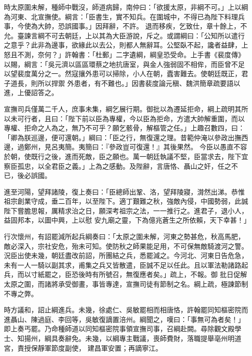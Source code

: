 \begin{pinyinscope}
 時太原圍未解，種師中戰沒，師道病歸，南仲曰：「欲援太原，非綱不可。」上以綱為河東、北宣撫使。綱言：「臣書生，實不知兵。在圍城中，不得已為陛下料理兵事，今使為大帥，恐誤國事。」因拜辭，不許。
 退而移疾，乞致仕，章十餘上，不允。臺諫言綱不可去朝廷，上以其為大臣游說，斥之。或謂綱曰：「公知所以遣行之意乎？此非為邊事，欲緣此以去公，則都人無辭耳。公堅臥不起，讒者益肆，上怒且不測，奈何？」許翰書：「杜郵」二字遺綱，綱皇恐受命。上手書《裴度傳》以賜，綱言：「吳元濟以區區環蔡之地抗唐室，與金人強弱固不相侔，而臣曾不足以望裴度萬分之一。然寇攘外患可以掃除，小人在朝，蠹害難去。使朝廷既正，君子道長，則所以捍禦
 外患者，有不難也。」因書裴度論元稹、魏洪簡章疏要語以進，上優詔答之。



 宣撫司兵僅萬二千人，庶事未集，綱乞展行期。御批以為遷延拒命，綱上疏明其所以未可行者，且曰：「陛下前以臣為專權，今以臣為拒命，方遣大帥解重圍，而以專權、拒命之人為之，無乃不可乎？願乞骸骨，解樞管之任。」上趣召數四，曰：「卿為朕巡邊，便可還朝。」綱曰：「臣之行，無復還之理。昔範仲淹以參政出撫西邊，過鄭州，見呂夷簡。夷簡曰：『參政豈可復還！』其後果然。
 今臣以愚直不容於朝，使既行之後，進而死敵，臣之願也。萬一朝廷執議不堅，臣當求去，陛下宜察臣孤忠，以全君臣之義。」上為之感動。及陛辭，言唐恪、聶山之奸，任之不已，後必誤國。



 進至河陽，望拜諸陵，復上奏曰：「臣總師出鞏、洛，望拜陵寢，潸然出涕。恭惟祖宗創業守成，垂二百年，以至陛下。適丁艱難之秋，強敵內侵，中國勢弱，此誠陛下嘗膽思報，厲精求治之日，願深考祖宗之法，一一推行之。進君子，退小人，益固邦本，以圖中興，上以慰
 安九廟之靈，下為億兆蒼生之所依賴，天下幸甚！」



 行次懷州，有詔罷減所起兵綱奏曰：「太原之圍未解，河東之勢甚危，秋高馬肥，敵必深入，宗社安危，殆未可知。使防秋之師果能足用，不可保無敵騎渡河之警。況臣出使未幾，朝廷盡改前詔，所團結之兵，悉罷減之。今河北、河東日告危急，未有一人一騎以副其求，甫集之兵又皆散遣，臣誠不足以任此。且以軍法勒諸路起兵，而以寸紙罷之，臣恐後時有所號召，無復應者矣。」疏上，不報。御
 批日促解太原之圍，而諸將承受御畫，事皆專達，宣撫司徒有節制之名。綱上疏，極諫節制不專之弊。



 時方議和，詔止綱進兵。未幾，徐處仁、吳敏罷相而相唐恪，許翰罷同知樞密院而進聶山、陳過庭、李回等，吳敏復謫置涪州。綱聞之，嘆曰：「事無可為者矣！」即上奏丐罷。乃命種師道以同知樞密院事領宣撫司事，召綱赴闕。尋除觀文殿學士、知揚州，綱具奏辭免。未幾，以綱專主戰議，喪師費財，落職提舉亳州明道宮，責授保靜軍節度副使，
 建昌軍安置；再謫寧江。




\end{pinyinscope}
